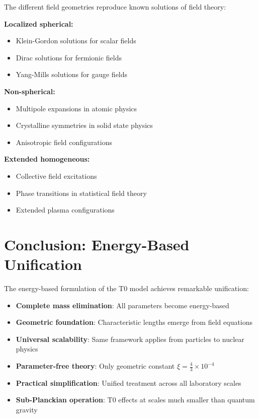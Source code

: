 \documentclass[12pt,a4paper]{report}
\begin{document}
	The different field geometries reproduce known solutions of field theory:
	
	\textbf{Localized spherical:} 
	\begin{itemize}
		\item Klein-Gordon solutions for scalar fields
		\item Dirac solutions for fermionic fields
		\item Yang-Mills solutions for gauge fields
	\end{itemize}
	
	\textbf{Non-spherical:}
	\begin{itemize}
		\item Multipole expansions in atomic physics
		\item Crystalline symmetries in solid state physics
		\item Anisotropic field configurations
	\end{itemize}
	
	\textbf{Extended homogeneous:}
	\begin{itemize}
		\item Collective field excitations
		\item Phase transitions in statistical field theory
		\item Extended plasma configurations
	\end{itemize}
	
	\section{Conclusion: Energy-Based Unification}
	\label{sec:conclusion_energy_unification}
	
	The energy-based formulation of the T0 model achieves remarkable unification:
	
	\begin{itemize}
		\item \textbf{Complete mass elimination}: All parameters become energy-based
		\item \textbf{Geometric foundation}: Characteristic lengths emerge from field equations
		\item \textbf{Universal scalability}: Same framework applies from particles to nuclear physics
		\item \textbf{Parameter-free theory}: Only geometric constant $\xi = \frac{4}{3} \times 10^{-4}$
		\item \textbf{Practical simplification}: Unified treatment across all laboratory scales
		\item \textbf{Sub-Planckian operation}: T0 effects at scales much smaller than quantum gravity
	\end{itemize}
	
\end{document}
